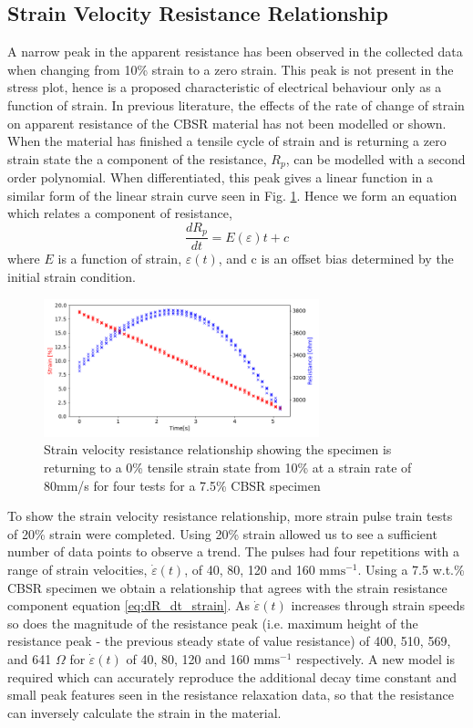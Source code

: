 \subsection{Strain Velocity Resistance Relationship}
A narrow peak in the apparent resistance has been observed in the collected data when changing from 10\% strain to a zero strain. This peak is not present in the stress plot, hence is a proposed characteristic of electrical behaviour only as a function of strain. In previous literature, the effects of the rate of change of strain on apparent resistance of the CBSR material has not been modelled or shown. When the material has finished a tensile cycle of strain and is returning a zero strain state the a component of the resistance, $R_p$, can be modelled with a second order polynomial. When differentiated, this peak gives a linear function in a similar form of the linear strain curve seen in Fig. \ref{fig:poly2_r_strain}. Hence we form an equation which relates a component of resistance,
\begin{equation} 
	\frac{dR_p}{dt} = E(\varepsilon)t + c
	\label{eq:dR_dt_strain}
\end{equation}
where $E$ is a function of strain, $\varepsilon(t)$, and c is an offset bias determined by the initial strain condition.
\begin{figure}[h!]
	\centering
	\includegraphics[width=8cm]{Figures/strain_velocity_res_80mms_2_7-5_E4pin_20mm_v11_0.2Strain_velocityprof.png}
	\caption{Strain velocity resistance relationship showing the specimen is returning to a 0\% tensile strain state from 10\% at a strain rate of 80mm/s for four tests for a 7.5\% CBSR specimen}
	\label{fig:poly2_r_strain}
\end{figure}
To show the strain velocity resistance relationship, more strain pulse train tests of 20\% strain were completed. Using 20\% strain allowed us to see a sufficient number of data points to observe a trend. The pulses had four repetitions with a range of strain velocities, $\dot{\varepsilon}(t)$, of 40, 80, 120 and 160 $\mathrm{mms^{-1}}$. Using a 7.5 w.t.\% CBSR specimen we obtain a relationship that agrees with the strain resistance component equation \ref{eq:dR_dt_strain}. As $\dot{\varepsilon}(t)$ increases through strain speeds so does the magnitude of the resistance peak (i.e. maximum height of the resistance peak - the previous steady state of value resistance) of 400, 510, 569, and 641 $\Omega$ for $\dot{\varepsilon}(t)$ of 40, 80, 120 and 160 $\mathrm{mms^{-1}}$  respectively. A new model is required which can accurately reproduce the additional decay time constant and small peak features seen in the resistance relaxation data, so that the resistance can inversely calculate the strain in the material. 

